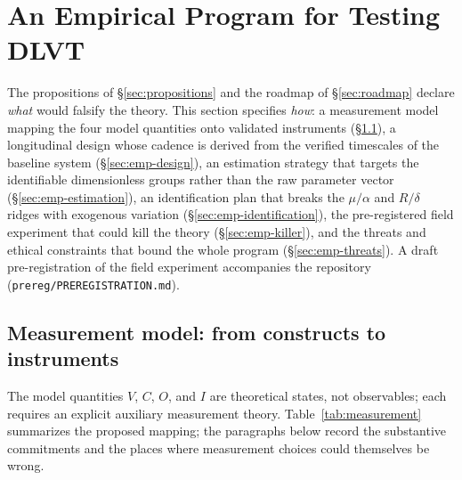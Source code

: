 %
%
\section{An Empirical Program for Testing DLVT}
\label{sec:empirical}

The propositions of \S\ref{sec:propositions} and the roadmap of
\S\ref{sec:roadmap} declare \emph{what} would falsify the theory. This
section specifies \emph{how}: a measurement model mapping the four model
quantities onto validated instruments (\S\ref{sec:emp-measurement}), a
longitudinal design whose cadence is derived from the verified timescales of
the baseline system (\S\ref{sec:emp-design}), an estimation strategy that
targets the identifiable dimensionless groups rather than the raw parameter
vector (\S\ref{sec:emp-estimation}), an identification plan that breaks the
$\mu/\alpha$ and $R/\delta$ ridges with exogenous variation
(\S\ref{sec:emp-identification}), the pre-registered field experiment that
could kill the theory (\S\ref{sec:emp-killer}), and the threats and ethical
constraints that bound the whole program (\S\ref{sec:emp-threats}). A draft
pre-registration of the field experiment accompanies the repository
(\texttt{prereg/PREREGISTRATION.md}).

\subsection{Measurement model: from constructs to instruments}
\label{sec:emp-measurement}

The model quantities $V$, $C$, $O$, and $I$ are theoretical states, not
observables; each requires an explicit auxiliary measurement theory.
Table~\ref{tab:measurement} summarizes the proposed mapping; the paragraphs
below record the substantive commitments and the places where measurement
choices could themselves be wrong.

